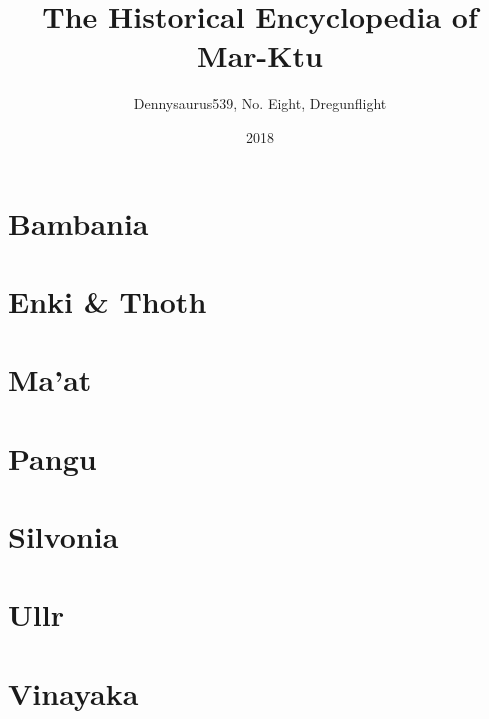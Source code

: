 \documentclass[ansiapaper, 11pt, openright, twoside]{book}
\title{The Historical Encyclopedia of Mar-Ktu}
\date{2018}
\author{Dennysaurus539, No. Eight, Dregunflight}
\begin{document}
	
	
	\chapter{Bambania}
	
	\chapter{Enki \& Thoth}
	
	\chapter{Ma'at}
	
	\chapter{Pangu}
	
	\chapter{Silvonia}
	
	\chapter{Ullr}
	
	\chapter{Vinayaka} 
	
	\printindex
	
\end{document}
